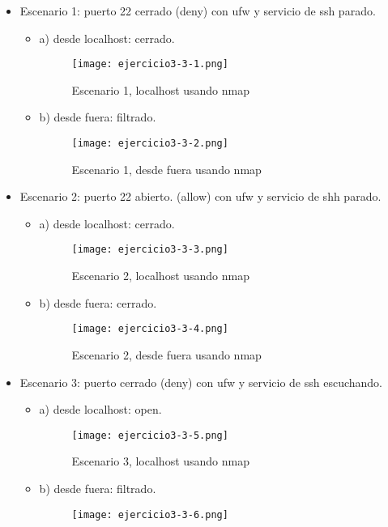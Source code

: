 	
	\begin{itemize}
		\item Escenario 1: puerto 22 cerrado (deny) con ufw y servicio de ssh parado.
			\begin{itemize}
				\item a) desde localhost: cerrado.
					\begin{figure}[H] 
						\centering
						\texttt{[image: ejercicio3-3-1.png]} 
						\label{figura29} 
						
						\caption{Escenario 1, localhost usando nmap}
					\end{figure}
				\item b) desde fuera: filtrado.
					\begin{figure}[H] 
						\centering
						\texttt{[image: ejercicio3-3-2.png]} 
						\label{figura30} 
						
						\caption{Escenario 1, desde fuera usando nmap}
					\end{figure}
			\end{itemize}
		\item Escenario 2: puerto 22 abierto. (allow) con ufw y servicio de shh parado.
			\begin{itemize}
				\item a) desde localhost: cerrado.
					\begin{figure}[H] 
						\centering
						\texttt{[image: ejercicio3-3-3.png]} 
						\label{figura31} 
						
						\caption{Escenario 2, localhost usando nmap}
					\end{figure}
				\item b) desde fuera: cerrado.
					\begin{figure}[H] 
						\centering
						\texttt{[image: ejercicio3-3-4.png]} 
						\label{figura32} 
						
						\caption{Escenario 2, desde fuera usando nmap}
					\end{figure}
			\end{itemize}
		\item Escenario 3: puerto cerrado (deny) con ufw y servicio de ssh escuchando.
			\begin{itemize}
				\item a) desde localhost: open.
					\begin{figure}[H] 
						\centering
						\texttt{[image: ejercicio3-3-5.png]} 
						\label{figura33} 
						
						\caption{Escenario 3, localhost usando nmap}
					\end{figure}
				\item b) desde fuera: filtrado.
					\begin{figure}[H] 
						\centering
						\texttt{[image: ejercicio3-3-6.png]} 
						\label{figura34} 
						

\end{figure}
\end{itemize}
\end{itemize}
